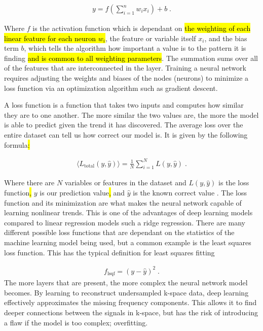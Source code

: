\documentclass[14pt]{extreport}
\begin{document}
        \begin{align}
           y = f\left(\sum_{i = 1}^n w_i x_i\right)  + b \;.
        \end{align}

        Where $f$ is the activation function which is dependant on \hl{the weighting of each linear feature for each neuron $w_i$}, the feature or variable itself $x_i$, and the bias term $b$, which tells the algorithm how important a value is to the pattern it is finding \hl{and is common to all weighting parameters}. The summation sums over all of the features that are interconnected in the layer. Training a neural network requires adjusting the weights and biases of the nodes (neurons) to minimize a loss function via an optimization algorithm such as gradient descent. 
        
        A loss function is a function that takes two inputs and computes how similar they are to one another. The more similar the two values are, the more the model is able to predict given the trend it has discovered. The average loss over the entire dataset can tell us how correct our model is. It is given by the following formula\hl{:}
        
        \begin{align}
            \langle L_{\text{total}}(y, \hat{y}) \rangle = \frac{1}{N} \sum_{i = 1}^N L(y, \hat{y})\;.
        \end{align}

        Where there are $N$ variables or features in the dataset and $L(y, \hat{y})$ is the loss function\hl{,} $y$ is our prediction value\hl{,} and $\hat{y}$ is the known correct value \cite{Hoyle_2024}. The loss function and its minimization are what makes the neural network capable of learning nonlinear trends. This is one of the advantages of deep learning models compared to linear regression models such a ridge regression. There are many different possible loss functions that are dependant on the statistics of the machine learning model being used, but a common example is the least squares loss function. This has the typical definition for least squares fitting \cite{Hoyle_2024}
        
        \begin{align}
            f_{\text{lsqf}} = \left(y - \hat{y} \right)^2\;.
        \end{align}
        The more layers that are present, the more complex the neural network model becomes. By learning to reconstruct undersampled k-space data, deep learning effectively approximates the missing frequency components. This allows it to find deeper connections between the signals in k-space, but has the risk of introducing a flaw if the model is too complex; overfitting. 
\end{document}
